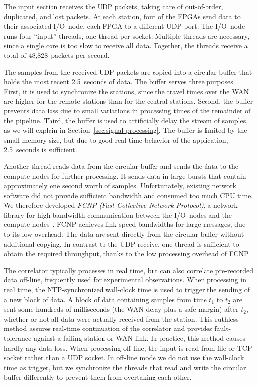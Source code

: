 \documentclass{sig-alternate}
\begin{document}
The input section receives the UDP packets, taking care of out-of-order,
duplicated, and lost packets.
At each station, four of the FPGAs send data to their associated I/O~node,
each FPGA to a different UDP port.
The I/O~node runs four ``input'' threads, one thread per socket.
Multiple threads are necessary, since a single core is too slow to receive all
data.
Together, the threads receive a total of 48,828~packets per second.

The samples from the received UDP packets are copied into a circular buffer that
holds the most recent 2.5~seconds of data.
The buffer serves three purposes.
First, it is used to synchronize the stations, since the travel times over
the WAN are higher for the remote stations than for the central stations.
Second, the buffer prevents data loss due to small variations in processing
times of the remainder of the pipeline.
Third, the buffer is used to artificially delay the stream of samples,
as we will explain in Section~\ref{sec:signal-processing}.
The buffer is limited by the small memory size, but due to good real-time
behavior of the application, 2.5~seconds is sufficient.

Another thread reads data from the circular buffer and sends the data to
the compute nodes for further processing. 
It sends data in large bursts that contain approximately one second worth of samples.
Unfortunately, existing network software did not provide sufficient bandwidth
and consumed too much CPU time.
We therefore developed \emph{FCNP (Fast Collective-Network Protocol)}, a 
network library for high-bandwidth communication between the I/O~nodes and the
compute nodes~\cite{Romein:09a}.
FCNP achieves link-speed bandwidths for large messages, due to
its low overhead.
The data are sent directly from the circular buffer without additional copying.
In contrast to the UDP receive, one thread is sufficient to obtain the
required throughput, thanks to the low processing overhead of FCNP.

The correlator typically processes in real time, but can also correlate
pre-recorded data off-line, frequently used for experimental observations.
When processing in real time, the NTP-synchronized wall-clock time
is used to trigger the sending of a new block of data.
A block of data containing samples from time $t_1$ to $t_2$ are sent some 
hundreds of milliseconds (the WAN delay plus a safe margin) after $t_2$,
whether or not all data were actually received from the station.
This ruthless method assures real-time continuation of the correlator and
provides fault-tolerance against a failing station or WAN link.
In practice, this method causes hardly any data loss.
When processing off-line, the input is read from file or TCP socket rather
than a UDP socket.
In off-line mode we do not use the wall-clock time as
trigger, but we synchronize the threads that read and write the circular
buffer differently to prevent them from overtaking each other.
\end{document}

